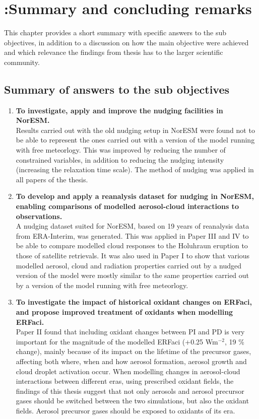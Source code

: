 \color{red}
\chapter[Summary and concluding remarks]{{\color{red} :}Summary and concluding remarks}
\label{ch:conclusion}

This chapter provides a short summary with specific answers to the sub objectives, in addition to a discussion on how the main objective were achieved and which relevance the findings from thesis has to the larger scientific community. 

\section{Summary of answers to the sub objectives}
\begin{enumerate}
        \item \textbf{To investigate, apply and improve the nudging facilities in NorESM.}\\
	      Results carried out with the old nudging setup in NorESM were found not to be able to represent the ones carried out with a version of the model running with free meteorlogy. This was improved by reducing the number of constrained variables, in addition to reducing the nudging intensity (increasing the relaxation time scale). The method of nudging was applied in all papers of the thesis. 
        \item \textbf{To develop and apply a reanalysis dataset for nudging in NorESM, enabling comparisons of modelled aerosol-cloud interactions to observations.} \\
	      A nudging dataset suited for NorESM, based on 19 years of reanalysis data from ERA-Interim, was generated. This was applied in Paper III and IV to be able to compare modelled cloud responses to the Holuhraun eruption to those of satellite retrievals. It was also used in Paper I to show that various modelled aerosol, cloud and radiation properties carried out by a nudged version of the model were mostly similar to the same properties carried out by a version of the model running with free meteorlogy. 
	\item \textbf{To investigate the impact of historical oxidant changes on ERFaci, and propose improved treatment of oxidants when modelling ERFaci.}\\
	      Paper II found that including oxidant changes between PI and PD is very important for the magnitude of the modelled ERFaci (+0.25 Wm$^{-2}$, 19 \% change), mainly because of its impact on the lifetime of the precursor gases, affecting both where, when and how aerosol formation, aerosol growth and cloud droplet activation occur. When modelling changes in aerosol-cloud interactions between different eras, using prescribed oxidant fields, the findings of this thesis suggest that not only aerosols and aerosol precursor gases should be switched between the two simulations, but also the oxidant fields. Aerosol precursor gases should be exposed to oxidants of its era. 

\end{enumerate}

